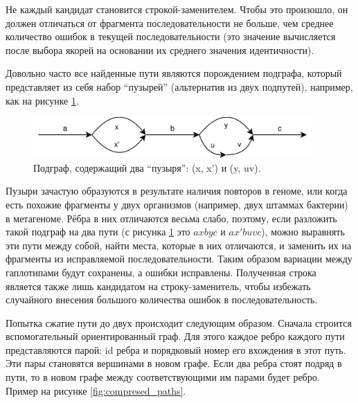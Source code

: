\documentclass[14pt]{matmex-diploma-custom}
\begin{document}
Не каждый кандидат становится строкой-заменителем. Чтобы это произошло, он должен отличаться от фрагмента последовательности не больше, чем среднее количество ошибок в текущей последовательности (это значение вычисляется после выбора якорей на основании их среднего значения идентичности).

Довольно часто все найденные пути являются порождением подграфа, который представляет из себя набор ``пузырей'' (альтернатив из двух подпутей), например, как на рисунке \ref{fig:buldges}. 

\begin{figure}[h]
    \centering
    \includegraphics[width=0.95\textwidth]{buldges.png}
    \caption{Подграф, содержащий два ``пузыря'': (x, x') и (y, uv).}
    \label{fig:buldges}
\end{figure}

Пузыри зачастую образуются в результате наличия повторов в геноме, или когда есть похожие фрагменты у двух организмов (например, двух штаммах бактерии) в метагеноме. Рёбра в них отличаются весьма слабо, поэтому, если разложить такой подграф на два пути (с рисунка \ref{fig:buldges} это $axbyc$ и $ax'buvc$), можно выравнять эти пути между собой, найти места, которые в них отличаются, и заменить их на фрагменты из исправляемой последовательности. Таким образом вариации между гаплотипами будут сохранены, а ошибки исправлены. Полученная строка является также лишь кандидатом на строку-заменитель, чтобы избежать случайного внесения большого количества ошибок в последовательность.

Попытка сжатие пути до двух происходит следующим образом.  Сначала строится вспомогательный ориентированный граф. Для этого каждое ребро каждого пути представляются парой: id ребра и порядковый номер его вхождения в этот путь. Эти пары становятся вершинами в новом графе. Если два ребра стоят подряд в пути, то в новом графе между соответствующими им парами будет ребро. Пример на рисунке \ref{fig:compresed_paths}.
\end{document}
